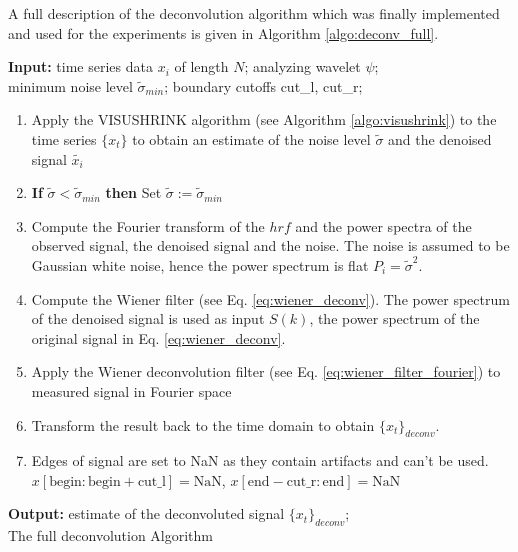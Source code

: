 A full description of the deconvolution algorithm which was finally implemented and used for the experiments is given in Algorithm \ref{algo:deconv_full}.

\begin{algorithm}[htb]

    \hspace*{\algorithmicindent} \textbf{Input:} time series data $x_i$ of length $N$; analyzing wavelet $\psi$;\\ \hspace*{\algorithmicindent} \phantom{Input:  } minimum noise level $\tilde{\sigma}_{min}$;
    boundary cutoffs cut\_l, cut\_r;  \\ 
    \begin{enumerate}
        \item Apply the VISUSHRINK algorithm (see Algorithm \ref{algo:visushrink}) to the time series $\{x_t\}$ to obtain an estimate of the 
        noise level $\tilde{\sigma}$ and the denoised signal $\tilde{x_i}$

        \item \textbf{If} $\tilde{\sigma} < \tilde{\sigma}_{min}$ \textbf{then} Set $\tilde{\sigma} := \tilde{\sigma}_{min}$

        \item Compute the Fourier transform of the $hrf$ and the power spectra of the observed signal, the denoised signal 
              and the noise. The noise is assumed to be Gaussian white noise, hence the power spectrum is flat $P_i = \tilde{\sigma}^2$.

        \item Compute the Wiener filter (see Eq. \ref{eq:wiener_deconv}). The power spectrum of the denoised signal is used as input
              $S(k)$, the power spectrum of the original signal in Eq. \ref{eq:wiener_deconv}.
        
        \item Apply the Wiener deconvolution filter (see Eq. \ref{eq:wiener_filter_fourier}) to measured signal in Fourier space
        
        \item Transform the result back to the time domain to obtain $\{x_t\}_{deconv}$.
        
        \item Edges of signal are set to NaN as they contain artifacts and can't be used. \newline
              $x \left[\text{begin}:\text{begin} + \text{cut\_l} \right] = \text{NaN}$, $x \left[\text{end}-\text{cut\_r}:\text{end}\right] = \text{NaN}$
    \end{enumerate}
    \hspace*{\algorithmicindent} \textbf{Output:} estimate of the deconvoluted signal $\{x_t\}_{deconv}$;\\ 
    \caption{The full deconvolution Algorithm}
    \label{algo:deconv_full}
\end{algorithm}

